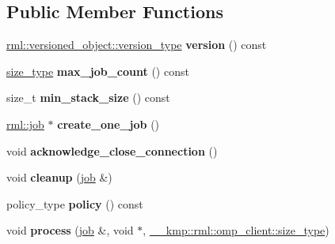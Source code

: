 \subsection*{Public Member Functions}
\begin{DoxyCompactItemize}
\item 
\hypertarget{classMyClient_af2e6d99a0116190bb1c9554beb3fe495}{}\hyperlink{classrml_1_1versioned__object_a759650010b271238ef9433442730c423}{rml\+::versioned\+\_\+object\+::version\+\_\+type} {\bfseries version} () const \label{classMyClient_af2e6d99a0116190bb1c9554beb3fe495}

\item 
\hypertarget{classMyClient_a002f3f6d968e90da1a140130099b14ec}{}\hyperlink{classrml_1_1client_a0dc06ede570f7ee6d3021862cb71119f}{size\+\_\+type} {\bfseries max\+\_\+job\+\_\+count} () const \label{classMyClient_a002f3f6d968e90da1a140130099b14ec}

\item 
\hypertarget{classMyClient_a5263aeb0145ac9e2bc4f68873b38d6ae}{}size\+\_\+t {\bfseries min\+\_\+stack\+\_\+size} () const \label{classMyClient_a5263aeb0145ac9e2bc4f68873b38d6ae}

\item 
\hypertarget{classMyClient_ad3e9e05b078d4f5a63375027bfcc2397}{}\hyperlink{classrml_1_1job}{rml\+::job} $\ast$ {\bfseries create\+\_\+one\+\_\+job} ()\label{classMyClient_ad3e9e05b078d4f5a63375027bfcc2397}

\item 
\hypertarget{classMyClient_a49c2dbfbe49b1aa41b3e7e4a581bc7ce}{}void {\bfseries acknowledge\+\_\+close\+\_\+connection} ()\label{classMyClient_a49c2dbfbe49b1aa41b3e7e4a581bc7ce}

\item 
\hypertarget{classMyClient_a8886ed17b7eb45b1ea23e9ad3e89ae22}{}void {\bfseries cleanup} (\hyperlink{classrml_1_1client_a684e4fee23d24f9d9d150eb38f2d254f}{job} \&)\label{classMyClient_a8886ed17b7eb45b1ea23e9ad3e89ae22}

\item 
\hypertarget{classMyClient_ab6b02eed4ec24f8d47cf85eaa4137ab1}{}policy\+\_\+type {\bfseries policy} () const \label{classMyClient_ab6b02eed4ec24f8d47cf85eaa4137ab1}

\item 
\hypertarget{classMyClient_a0429aeef1775ddb173510863d708e7e8}{}void {\bfseries process} (\hyperlink{classrml_1_1client_a684e4fee23d24f9d9d150eb38f2d254f}{job} \&, void $\ast$, \hyperlink{classrml_1_1client_a0dc06ede570f7ee6d3021862cb71119f}{\+\_\+\+\_\+kmp\+::rml\+::omp\+\_\+client\+::size\+\_\+type})\label{classMyClient_a0429aeef1775ddb173510863d708e7e8}


\end{DoxyCompactItemize}
